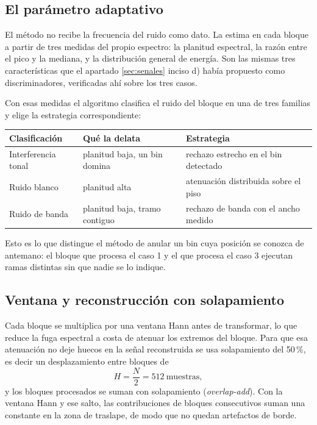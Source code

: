 \subsection{El parámetro adaptativo}

El método no recibe la frecuencia del ruido como dato. La estima en cada bloque a
partir de tres medidas del propio espectro: la planitud espectral, la razón entre
el pico y la mediana, y la distribución general de energía. Son las mismas tres
características que el apartado \ref{sec:senales} inciso d) había propuesto como
discriminadores, verificadas ahí sobre los tres casos.

Con esas medidas el algoritmo clasifica el ruido del bloque en una de tres
familias y elige la estrategia correspondiente:

\begin{center}\small
\begin{tabular}{lll}
\toprule
Clasificación & Qué la delata & Estrategia \\
\midrule
Interferencia tonal & planitud baja, un bin domina & rechazo estrecho en el bin detectado \\
Ruido blanco        & planitud alta               & atenuación distribuida sobre el piso \\
Ruido de banda      & planitud baja, tramo contiguo & rechazo de banda con el ancho medido \\
\bottomrule
\end{tabular}
\end{center}

Esto es lo que distingue el método de anular un bin cuya posición se conozca de
antemano: el bloque que procesa el caso 1 y el que procesa el caso 3 ejecutan
ramas distintas sin que nadie se lo indique.

\subsection{Ventana y reconstrucción con solapamiento}

Cada bloque se multiplica por una ventana Hann antes de transformar, lo que
reduce la fuga espectral a costa de atenuar los extremos del bloque. Para que esa
atenuación no deje huecos en la señal reconstruida se usa solapamiento del
50\,\%, es decir un desplazamiento entre bloques de
\[
H = \frac{N}{2} = 512\ \text{muestras},
\]
y los bloques procesados se suman con solapamiento (\emph{overlap-add}). Con la
ventana Hann y ese salto, las contribuciones de bloques consecutivos suman una
constante en la zona de traslape, de modo que no quedan artefactos de borde.


